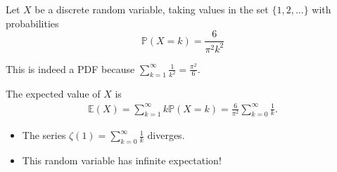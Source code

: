 \documentclass[lecture]{csm}
\newcommand{\prob}{\mathbb{P}}
\newcommand{\expe}{\mathbb{E}}
\def\it{\item}
\def\bit{\begin{itemize}}
\def\eit{\end{itemize}}
\begin{document}
\begin{example}
Let $X$ be a discrete random variable, taking values in the set $\{1,2,\ldots\}$ with probabilities
\[
\prob(X=k) = \frac{6}{\pi^2 k^2}
\]

This is indeed a PDF because 
$\displaystyle\sum_{k=1}^{\infty} \frac{1}{k^2} = \frac{\pi^2}{6}$.

The expected value of $X$ is
\begin{align*}
\expe(X) 
	= \sum_{k=1}^{\infty} k \prob(X=k)
	= \frac{6}{\pi^2}\sum_{k=0}^{\infty}\frac{1}{k}.
\end{align*}

\bit
\it The series $\displaystyle \zeta(1) = \sum_{k=0}^{\infty}\frac{1}{k}$ diverges.
\it This random variable has {infinite expectation}!
\eit
\end{example}
\end{document}
